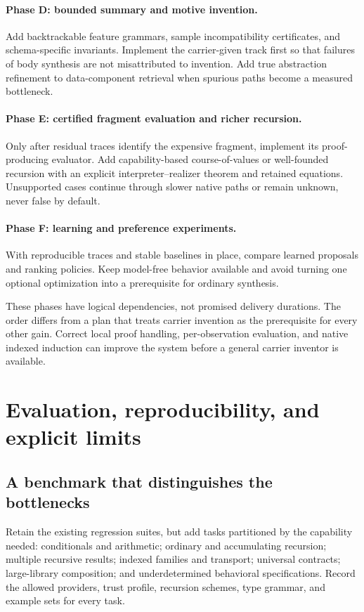 \documentclass[11pt,a4paper]{article}
\theoremstyle{remark}
\begin{document}
\paragraph{Phase D: bounded summary and motive invention.}
Add backtrackable feature grammars, sample incompatibility certificates, and
schema-specific invariants. Implement the carrier-given track first so that
failures of body synthesis are not misattributed to invention. Add true
abstraction refinement to data-component retrieval when spurious paths become
a measured bottleneck.

\paragraph{Phase E: certified fragment evaluation and richer recursion.}
Only after residual traces identify the expensive fragment, implement its
proof-producing evaluator. Add capability-based course-of-values or
well-founded recursion with an explicit interpreter--realizer theorem and
retained equations. Unsupported cases continue through slower native paths
or remain unknown, never false by default.

\paragraph{Phase F: learning and preference experiments.}
With reproducible traces and stable baselines in place, compare learned
proposals and ranking policies. Keep model-free behavior available and avoid
turning one optional optimization into a prerequisite for ordinary synthesis.

These phases have logical dependencies, not promised delivery durations.
The order differs from a plan that treats carrier invention as the prerequisite
for every other gain. Correct local proof handling, per-observation evaluation,
and native indexed induction can improve the system before a general carrier
inventor is available.

\section{Evaluation, reproducibility, and explicit limits}
\label{sec:evaluation}

\subsection{A benchmark that distinguishes the bottlenecks}

Retain the existing regression suites, but add tasks partitioned by the
capability needed: conditionals and arithmetic; ordinary and accumulating
recursion; multiple recursive results; indexed families and transport;
universal contracts; large-library composition; and underdetermined
behavioral specifications. Record the allowed providers, trust profile,
recursion schemes, type grammar, and example sets for every task.
\end{document}
